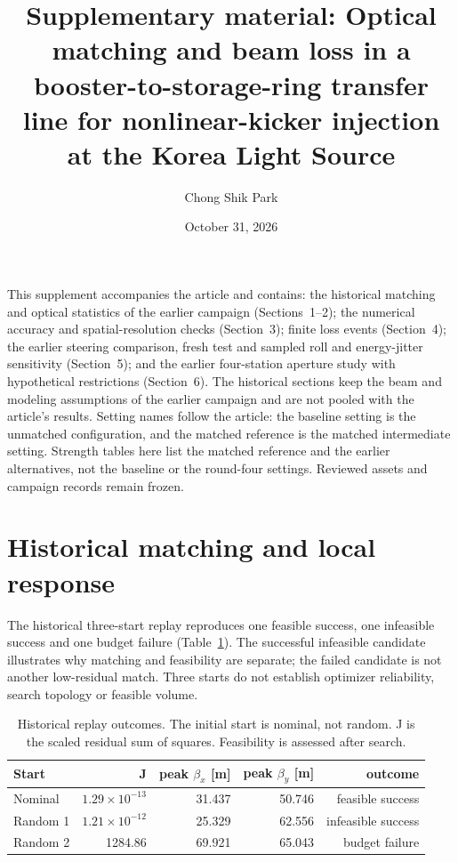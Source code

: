 \documentclass[10pt,a4paper]{article}
\title{Supplementary material: Optical matching and beam loss in a booster-to-storage-ring transfer line for nonlinear-kicker injection at the Korea Light Source}
\author{Chong Shik Park}
\date{October 31, 2026}
\begin{document}
\maketitle
This supplement accompanies the article and contains: the historical matching
and optical statistics of the earlier campaign (Sections~1--2); the numerical
accuracy and spatial-resolution checks (Section~3); finite loss events
(Section~4); the earlier steering comparison, fresh test and sampled roll and energy-jitter
sensitivity (Section~5); and the earlier four-station aperture study with hypothetical
restrictions (Section~6). The historical sections keep the beam and modeling
assumptions of the earlier campaign and are not pooled with the article's results.
Setting names follow the article: the baseline setting is the unmatched
configuration, and the matched reference is the matched intermediate setting.
Strength tables here list the matched reference and the earlier alternatives, not
the baseline or the round-four settings. Reviewed assets and campaign records remain
frozen.

\section{Historical matching and local response}
The historical three-start replay reproduces one feasible success, one
infeasible success and one budget failure (Table~\ref{tab:starts}). The
successful infeasible candidate illustrates why matching and feasibility are
separate; the failed candidate is not another low-residual match. Three starts
do not establish optimizer reliability, search topology or feasible volume.

\begin{table}[htbp]\centering
\caption{Historical replay outcomes. The initial start is nominal, not random.
J is the scaled residual sum of squares. Feasibility is assessed after search.}\label{tab:starts}
\begin{tabular}{lrrrr}\toprule
Start & J & peak $\beta_x$ [\si{\metre}] & peak $\beta_y$ [\si{\metre}] & outcome\\\midrule
Nominal & $1.29\times10^{-13}$ & 31.437 & 50.746 & feasible success\\
Random 1 & $1.21\times10^{-12}$ & 25.329 & 62.556 & infeasible success\\
Random 2 & 1284.86 & 69.921 & 65.043 & budget failure\\
\bottomrule\end{tabular}\end{table}
\end{document}
